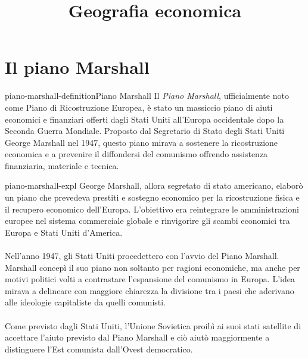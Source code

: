 \documentclass[preview]{standalone}
\begin{document}
\title{Geografia economica}
\genpage

\section{Il piano Marshall}

\begin{snippetdefinition}{piano-marshall-definition}{Piano Marshall}
    Il \textit{Piano Marshall}, ufficialmente noto come Piano di Ricostruzione Europea,
    è stato un massiccio piano di aiuti economici e finanziari offerti dagli Stati Uniti
    all'Europa occidentale dopo la Seconda Guerra Mondiale.
    Proposto dal Segretario di Stato degli Stati Uniti George Marshall nel 1947,
    questo piano mirava a sostenere la ricostruzione economica e a prevenire
    il diffondersi del comunismo offrendo assistenza finanziaria, materiale e tecnica.
\end{snippetdefinition}

\begin{snippet}{piano-marshall-expl}
    George Marshall, allora segretato di stato americano, elaborò un piano che prevedeva prestiti e sostegno economico
    per la ricostruzione fisica e il recupero economico dell'Europa. L'obiettivo era reintegrare le amministrazioni
    europee nel sistema commerciale globale e rinvigorire gli scambi economici tra Europa e Stati Uniti d'America.
    \\\\
    Nell'anno 1947, gli Stati Uniti procedettero con l'avvio del Piano Marshall.
    Marshall concepì il suo piano non soltanto per ragioni economiche, ma anche per motivi politici volti a contrastare
    l'espansione del comunismo in Europa. L'idea mirava a delineare con maggiore chiarezza la divisione tra i paesi
    che aderivano alle ideologie capitaliste da quelli comunisti.
    \\\\
    Come previsto dagli Stati Uniti, l'Unione Sovietica proibì ai suoi stati satellite di accettare l'aiuto previsto dal
    Piano Marshall e ciò aiutò maggiormente a distinguere l'Est comunista dall'Ovest democratico.
\end{snippet}
\end{document}
